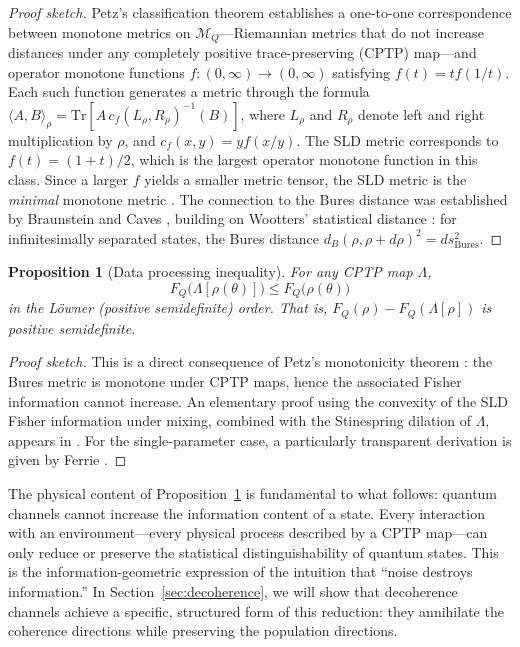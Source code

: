 \documentclass[12pt,a4paper]{article}
\newtheorem{proposition}[theorem]{Proposition}
\theoremstyle{definition}
\theoremstyle{remark}
\begin{document}
\begin{proof}[Proof sketch]
Petz's classification theorem \cite{petz1996monotone} establishes a one-to-one correspondence between monotone metrics on $\mathcal{M}_Q$---Riemannian metrics that do not increase distances under any completely positive trace-preserving (CPTP) map---and operator monotone functions $f:(0,\infty) \to (0,\infty)$ satisfying $f(t) = t f(1/t)$. Each such function generates a metric through the formula $\langle A, B \rangle_\rho = \mathrm{Tr}[A\, c_f(L_\rho, R_\rho)^{-1}(B)]$, where $L_\rho$ and $R_\rho$ denote left and right multiplication by $\rho$, and $c_f(x,y) = y f(x/y)$. The SLD metric corresponds to $f(t) = (1+t)/2$, which is the largest operator monotone function in this class. Since a larger $f$ yields a smaller metric tensor, the SLD metric is the \emph{minimal} monotone metric \cite{petz1996monotone}. The connection to the Bures distance \cite{bures1969extension,uhlmann1976transition} was established by Braunstein and Caves \cite{braunstein1994statistical}, building on Wootters' statistical distance \cite{wootters1981statistical}: for infinitesimally separated states, the Bures distance $d_B(\rho, \rho + d\rho)^2 = ds^2_{\mathrm{Bures}}$.
\end{proof}

\begin{proposition}[Data processing inequality]
\label{prop:dpi}
For any CPTP map $\Lambda$,
\begin{equation}
\label{eq:dpi}
F_Q\bigl(\Lambda[\rho(\theta)]\bigr) \leq F_Q\bigl(\rho(\theta)\bigr)
\end{equation}
in the L\"owner (positive semidefinite) order. That is, $F_Q(\rho) - F_Q(\Lambda[\rho])$ is positive semidefinite.
\end{proposition}

\begin{proof}[Proof sketch]
This is a direct consequence of Petz's monotonicity theorem \cite{petz1996monotone}: the Bures metric is monotone under CPTP maps, hence the associated Fisher information cannot increase. An elementary proof using the convexity of the SLD Fisher information under mixing, combined with the Stinespring dilation of $\Lambda$, appears in \cite{liu2020quantum}. For the single-parameter case, a particularly transparent derivation is given by Ferrie \cite{ferrie2014best}.
\end{proof}

The physical content of Proposition~\ref{prop:dpi} is fundamental to what follows: quantum channels cannot increase the information content of a state. Every interaction with an environment---every physical process described by a CPTP map---can only reduce or preserve the statistical distinguishability of quantum states. This is the information-geometric expression of the intuition that ``noise destroys information.'' In Section~\ref{sec:decoherence}, we will show that decoherence channels achieve a specific, structured form of this reduction: they annihilate the coherence directions while preserving the population directions.
\end{document}
